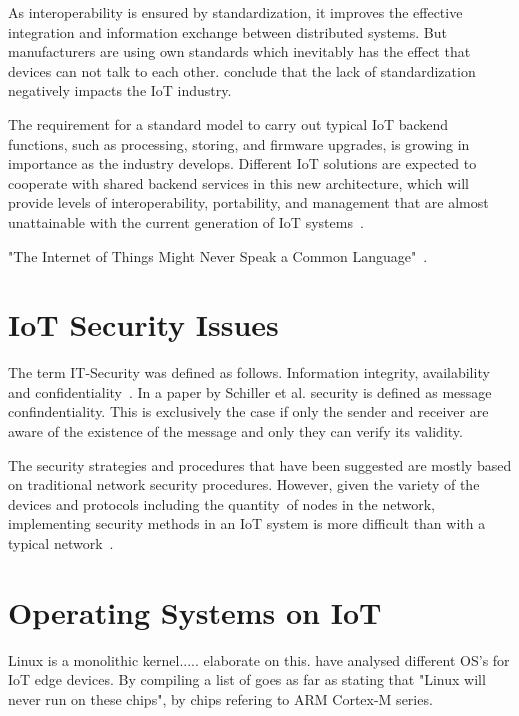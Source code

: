 As interoperability is ensured by standardization, it improves the effective integration and information exchange between distributed systems. But manufacturers are using own standards which inevitably has the effect that devices can not talk to each other. \cite{al2016iot} conclude that the lack of standardization negatively impacts the IoT industry.

The requirement for a standard model to carry out typical IoT backend functions, such as processing, storing, and firmware upgrades, is growing in importance as the industry develops. Different IoT solutions are expected to cooperate with shared backend services in this new architecture, which will provide levels of interoperability, portability, and management that are almost unattainable with the current generation of IoT systems~\cite{banafa2016iot}.

"The Internet of Things Might Never Speak a Common Language"~\cite{newman2016internet}.




\section{IoT Security Issues}

The term IT-Security was defined as follows. Information integrity, availability and confidentiality~\cite{voydock1983security}. In a paper by Schiller et al. \cite{schiller} security is defined as message confindentiality. This is exclusively the case if only the sender and receiver are aware of the existence of the message and only they can verify its validity.

The security strategies and procedures that have been suggested are mostly based on traditional network security procedures. However, given the variety of the devices and protocols including the quantity of nodes in the network, implementing security methods in an IoT system is more difficult than with a typical network~\cite{hassan2019current}.

\section{Operating Systems on IoT} \label{iotos}

\cmark

Linux is a monolithic kernel..... elaborate on this.
\cite{milinkovic2015choosing} have analysed different OS's for IoT edge devices. By compiling a list of  
\cite{milinkovic2015choosing} goes as far as stating that "Linux will never run on these chips", by chips refering to ARM Cortex-M series.
\cite{sabri2017comparison}


